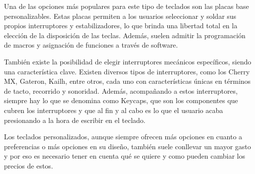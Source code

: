 Una de las opciones más populares para este tipo de teclados son las placas base personalizables. Estas placas permiten a los usuarios seleccionar y soldar sus propios interruptores y estabilizadores, lo que brinda una libertad total en la elección de la disposición de las teclas. Además, suelen admitir la programación de macros y asignación de funciones a través de software.

También existe la posibilidad de elegir interruptores mecánicos específicos, siendo una característica clave. Existen diversos tipos de interruptores, como los Cherry MX, Gateron, Kailh, entre otros, cada uno con características únicas en términos de tacto, recorrido y sonoridad. Además, acompañando a estos interruptores, siempre hay lo que se denomina como \gls{Keycaps}, que son los componentes que cubren los interruptores y que al fin y al cabo es lo que el usuario acaba presionando a la hora de escribir en el teclado.

Los teclados personalizados, aunque siempre ofrecen más opciones en cuanto a preferencias o más opciones en su diseño, también suele conllevar un mayor gasto y por eso es necesario tener en cuenta qué se quiere y como pueden cambiar los precios de estos.

